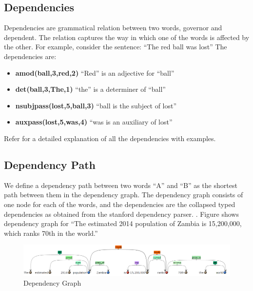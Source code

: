\documentclass[a4paper,10pt]{article}
\begin{document}
\subsection{Dependencies}
Dependencies are grammatical relation between two words, governor and dependent.
The relation captures the way in which one of the words is affected by the other.
For example, consider the sentence:
``The red ball was lost''
The dependencies are:
\begin{itemize}

\item \textbf{amod(ball,3,red,2)} ``Red'' is an adjective for ``ball''
\item \textbf{det(ball,3,The,1)}  ``the'' is a determiner of ``ball''
\item \textbf{nsubjpass(lost,5,ball,3)}	``ball is the subject of lost''
\item \textbf{auxpass(lost,5,was,4)}	``was is an auxiliary of lost''
\end {itemize}

Refer \cite{de2008stanford} for a detailed explanation of all the dependencies with examples.

\subsection{Dependency Path}
We define a dependency path between two words ``A'' and ``B'' as the shortest path between them in the dependency graph.
The dependency graph consists of one node for each of the words, and the dependencies are the collapsed typed dependencies 
as obtained from the stanford dependency parser. \cite{corenlp}. 
Figure \cite{fig:1} shows dependency graph for ``The estimated 2014 population of Zambia is 15,200,000, which ranks 70th in the world.''
\begin{figure}
 \centering
 \includegraphics[bb=0 0 990 149, scale = 0.4]{./dep.png}
 \caption{Dependency Graph}
 \label{fig:1}
\end{figure}
\end{document}
